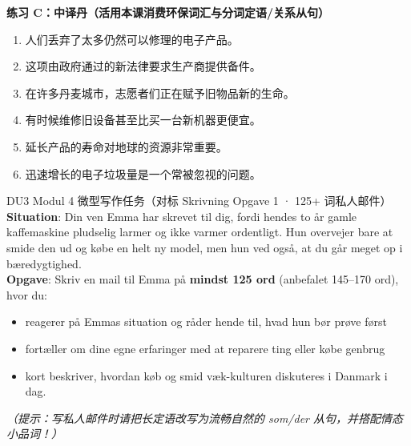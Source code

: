 \textbf{练习 C：中译丹（活用本课消费环保词汇与分词定语/关系从句）}
\begin{enumerate}
  \item 人们丢弃了太多仍然可以修理的电子产品。
  \item 这项由政府通过的新法律要求生产商提供备件。
  \item 在许多丹麦城市，志愿者们正在赋予旧物品新的生命。
  \item 有时候维修旧设备甚至比买一台新机器更便宜。
  \item 延长产品的寿命对地球的资源非常重要。
  \item 迅速增长的电子垃圾量是一个常被忽视的问题。
\end{enumerate}


\begin{emailbox}{DU3 Modul 4 微型写作任务（对标 Skrivning Opgave 1 · 125+ 词私人邮件）}
\textbf{Situation}: Din ven Emma har skrevet til dig, fordi hendes to år gamle kaffemaskine pludselig larmer og ikke varmer ordentligt. Hun overvejer bare at smide den ud og købe en helt ny model, men hun ved også, at du går meget op i bæredygtighed.\\[4pt]
\textbf{Opgave}: Skriv en mail til Emma på \textbf{mindst 125 ord} (anbefalet 145--170 ord), hvor du:
\begin{itemize}
  \item reagerer på Emmas situation og råder hende til, hvad hun bør prøve først
  \item fortæller om dine egne erfaringer med at reparere ting eller købe genbrug
  \item kort beskriver, hvordan køb og smid væk-kulturen diskuteres i Danmark i dag.
\end{itemize}
\textit{（提示：写私人邮件时请把长定语改写为流畅自然的 \textit{som/der} 从句，并搭配情态小品词！）}
\end{emailbox}

